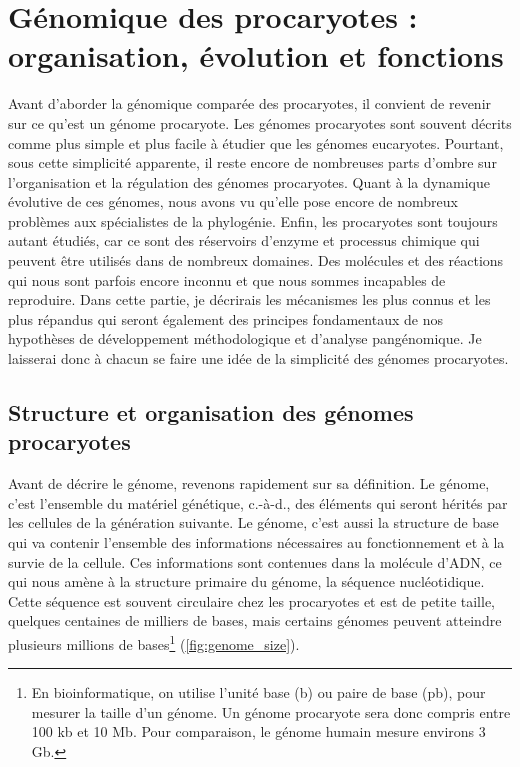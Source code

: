 \chapter{Génomique des procaryotes : organisation, évolution et fonctions}

Avant d'aborder la génomique comparée des procaryotes, il convient de revenir sur ce qu'est un génome procaryote. Les génomes procaryotes sont souvent décrits comme plus simple et plus facile à étudier que les génomes eucaryotes. Pourtant, sous cette simplicité apparente, il reste encore de nombreuses parts d'ombre sur l'organisation et la régulation des génomes procaryotes. Quant à la dynamique évolutive de ces génomes, nous avons vu qu'elle pose encore de nombreux problèmes aux spécialistes de la phylogénie. Enfin, les procaryotes sont toujours autant étudiés, car ce sont des réservoirs d'enzyme et processus chimique qui peuvent être utilisés dans de nombreux domaines. Des molécules et des réactions qui nous sont parfois encore inconnu et que nous sommes incapables de reproduire. Dans cette partie, je décrirais les mécanismes les plus connus et les plus répandus qui seront également des principes fondamentaux de nos hypothèses de développement méthodologique et d'analyse pangénomique. Je laisserai donc à chacun se faire une idée de la simplicité des génomes procaryotes. 

\section{Structure et organisation des génomes procaryotes}

Avant de décrire le génome, revenons rapidement sur sa définition. Le génome, c'est l'ensemble du matériel génétique, c.-à-d., des éléments qui seront hérités par les cellules de la génération suivante. Le génome, c'est aussi la structure de base qui va contenir l'ensemble des informations nécessaires au fonctionnement et à la survie de la cellule. Ces informations sont contenues dans la molécule d'ADN, ce qui nous amène à la structure primaire du génome, la séquence nucléotidique. Cette séquence est souvent circulaire chez les procaryotes et est de petite taille, quelques centaines de milliers de bases, mais certains génomes peuvent atteindre plusieurs millions de bases\footnote{En bioinformatique, on utilise l'unité base (b) ou paire de base (pb), pour mesurer la taille d'un génome. Un génome procaryote sera donc compris entre 100 kb et 10 Mb. Pour comparaison, le génome humain mesure environs 3 Gb.} (\autoref{fig:genome_size}).


